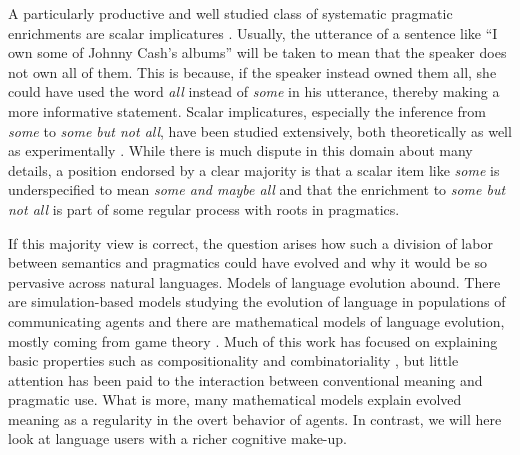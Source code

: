 \documentclass[a4paper, 11pt]{article}
\theoremstyle{Satz}
\begin{document}
A particularly productive and well studied class of systematic pragmatic enrichments are scalar
implicatures
\citep{horn:1984,Hirschberg1985:A-Theory-of-Sca,LevinsonPragmatics1983,Geurts2010:Quantity-Implic}. Usually,
the utterance of a sentence like ``I own some of Johnny Cash's albums'' will be taken to mean
that the speaker does not own all of them. This is because, if the speaker instead owned them all, she
could have used the word \emph{all} instead of \emph{some} in his utterance, thereby making a
more informative statement. Scalar implicatures, especially the inference from \emph{some} to
\emph{some but not all}, have been studied extensively, both theoretically
\citep[e.g.,][]{Sauerland2004:Scalar-Implicat,ChierchiaFox2008:The-Grammatical,Rooyvan-RooijJagerde-Jager2012:Explaining-Quan}
as well as experimentally
\citep[e.g.,][]{BottNoveck2004:Some-Utterances,huang+snedeker:2009,GrodnerKlein2010:Some-and-Possib,GoodmanStuhlmuller2013:Knowledge-and-I,DegenTanenhaus2012:Processing-Scal}. While
there is much dispute in this domain about many details, a position endorsed by a clear
majority is that a scalar item like \emph{some} is underspecified to mean \emph{some and maybe
  all} and that the enrichment to \emph{some but not all} is part of some regular process with
roots in pragmatics.

If this majority view is correct, the question arises how such a division of labor between
semantics and pragmatics could have evolved and why it would be so pervasive across natural
languages. Models of language evolution abound. There are simulation-based models studying the
evolution of language in populations of communicating agents
\citep{Hurford1989:Biological-Evol,Steels1995:A-Self-Organizi,LenaertsJansen2005:The-Evolutionar,SteelsBelpaeme2005:Coordinating-Pe,BaronchelliPuglisi2008:Cultural-route-,steels:2011,SpikeStadler2016:Minimal-Require}
and there are mathematical models of language evolution, mostly coming from game theory
\citep{lewis:1969,Warneryd1993:Cheap-Talk-Coor,BlumeKim1993:Evolutionary-St,nowak+krakauer:1999,Huttegger2007:Evolution-and-t,Skyrms2010:Signals}. Much
of this work has focused on explaining basic properties such as compositionality and
combinatoriality
\citep[e.g.,][]{Batali1998:Computational-S,nowak+krakauer:1999,nowak+etal:2000,KirbyHurford2002:The-Emergence-o,kirby:2002,SmithKirby2003:Iterated-Learni,Gong2007:Language-Evolut,kirby+etal:2015,verhoef+etal:2014,Franke2015:Proto-Syntax},
but little attention has been paid to the interaction between conventional meaning and
pragmatic use. What is more, many mathematical models explain evolved meaning as a regularity
in the overt behavior of agents. In contrast, we will here look at language users with a richer
cognitive make-up.
\end{document}
